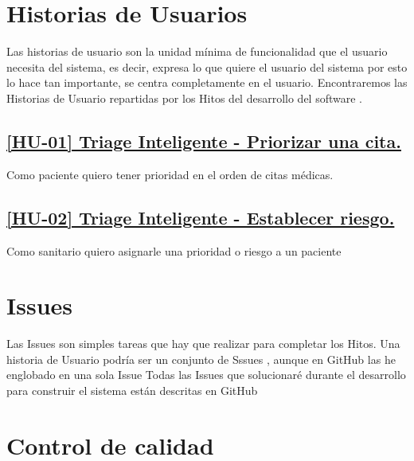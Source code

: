 \section{Historias de Usuarios}
Las historias de usuario son la unidad mínima de funcionalidad que el usuario necesita del sistema, es decir, 
expresa lo que quiere el usuario del sistema por esto lo hace tan importante, se centra completamente en el 
usuario. Encontraremos las Historias de Usuario repartidas por los Hitos del desarrollo del software .


\subsection*{\href{https://github.com/RubenDelgadoPareja/TFG-Triage-Inteligente-Consulta-Medica/issues/19}{[HU-01] Triage Inteligente - Priorizar una cita.}}

Como paciente quiero tener prioridad en el orden de citas médicas.

\subsection*{\href{https://github.com/RubenDelgadoPareja/TFG-Triage-Inteligente-Consulta-Medica/issues/5}{[HU-02] Triage Inteligente - Establecer riesgo.}}

Como sanitario quiero asignarle una prioridad o riesgo a un paciente

\section{Issues}
Las Issues son simples tareas que hay que realizar para completar los Hitos. 
Una historia de Usuario podría ser un conjunto de Sssues , aunque en GitHub las he englobado en una sola Issue
Todas las Issues que solucionaré durante el desarrollo para construir el sistema están descritas en GitHub 


\section{Control de calidad}

